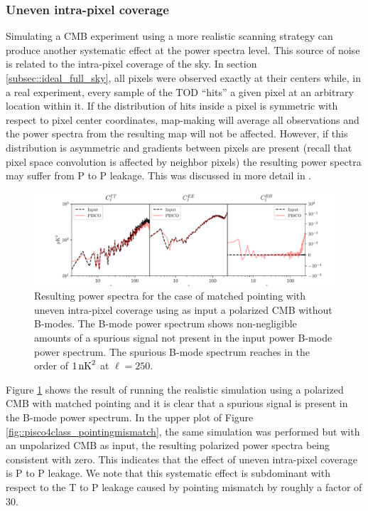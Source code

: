 \documentclass[a4paper,11pt]{article}
\begin{document}
\subsubsection{Uneven intra-pixel coverage}

Simulating a CMB experiment using a more realistic scanning strategy can produce another systematic effect at the power spectra level. This source of noise is related to the intra-pixel coverage of the sky. In section \ref{subsec::ideal_full_sky}, all pixels were observed exactly at their centers while, in a real experiment, every sample of the TOD ``hits'' a given pixel at an arbitrary location within it. If the distribution of hits inside a pixel is symmetric with respect to pixel center coordinates, map-making will average all observations and the power spectra from the resulting map will not be affected. However, if this distribution is asymmetric and gradients between pixels are present (recall that pixel space convolution is affected by neighbor pixels) the resulting power spectra may suffer from P to P leakage. This was discussed in more detail in \cite{2005poutanen}. 

\begin{figure}
	\centering
	\includegraphics[width=1\textwidth]{figures/cmb_r0d00_CLASS_matchedPointing_matchedBeams_ellipticalBeams.pdf}
	\caption{Resulting power spectra for the case of matched pointing with uneven intra-pixel coverage using as input a polarized CMB without B-modes. The B-mode power spectrum shows non-negligible amounts of a spurious signal not present in the input power B-mode power spectrum. The spurious B-mode spectrum reaches in the order of $1\, \rm{nK}^2$ at $\ell = 250$.}
	\label{fig::pisco4class_intrapixel}
\end{figure}

Figure \ref{fig::pisco4class_intrapixel} shows the result of running the realistic simulation using a polarized CMB with matched pointing and it is clear that a spurious signal is present in the B-mode power spectrum. In the upper plot of Figure \ref{fig::pisco4class_pointingmismatch}, the same simulation was performed but with an unpolarized CMB as input, the resulting polarized power spectra being consistent with zero. This indicates that the effect of uneven intra-pixel coverage is P to P leakage. We note that this systematic effect is subdominant with respect to the T to P leakage caused by pointing mismatch by roughly a factor of $30$.
\end{document}
